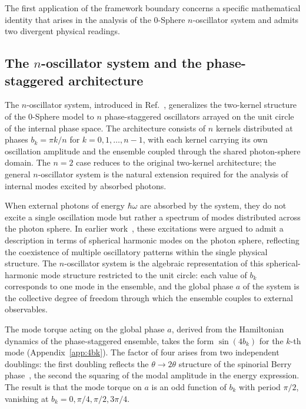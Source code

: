 \documentclass[%
 reprint, amsmath,amssymb, aps, prb, ]{revtex4-2}
\numberwithin{equation}{section}
\begin{document}
The first application of the framework boundary concerns a specific mathematical identity that arises in the analysis of the 0-Sphere $n$-oscillator system and admits two divergent physical readings.

\subsection{The $n$-oscillator system and the phase-staggered architecture}
\label{sec:noscillator}

The $n$-oscillator system, introduced in Ref.~\cite{hanamura50}, generalizes the two-kernel structure of the 0-Sphere model to $n$ phase-staggered oscillators arrayed on the unit circle of the internal phase space. The architecture consists of $n$ kernels distributed at phases $b_k = \pi k / n$ for $k = 0, 1, \ldots, n-1$, with each kernel carrying its own oscillation amplitude and the ensemble coupled through the shared photon-sphere domain. The $n=2$ case reduces to the original two-kernel architecture; the general $n$-oscillator system is the natural extension required for the analysis of internal modes excited by absorbed photons.

When external photons of energy $\hbar\omega$ are absorbed by the system, they do not excite a single oscillation mode but rather a spectrum of modes distributed across the photon sphere. In earlier work~\cite{hanamura50, hanamura48}, these excitations were argued to admit a description in terms of spherical harmonic modes on the photon sphere, reflecting the coexistence of multiple oscillatory patterns within the single physical structure. The $n$-oscillator system is the algebraic representation of this spherical-harmonic mode structure restricted to the unit circle: each value of $b_k$ corresponds to one mode in the ensemble, and the global phase $a$ of the system is the collective degree of freedom through which the ensemble couples to external observables.

The mode torque acting on the global phase $a$, derived from the Hamiltonian dynamics of the phase-staggered ensemble, takes the form $\sin(4b_k)$ for the $k$-th mode (Appendix~\ref{app:4bk}). The factor of four arises from two independent doublings: the first doubling reflects the $\theta \to 2\theta$ structure of the spinorial Berry phase~\cite{hanamura26, hanamura48}, the second the squaring of the modal amplitude in the energy expression. The result is that the mode torque on $a$ is an odd function of $b_k$ with period $\pi/2$, vanishing at $b_k = 0, \pi/4, \pi/2, 3\pi/4$.
\end{document}
